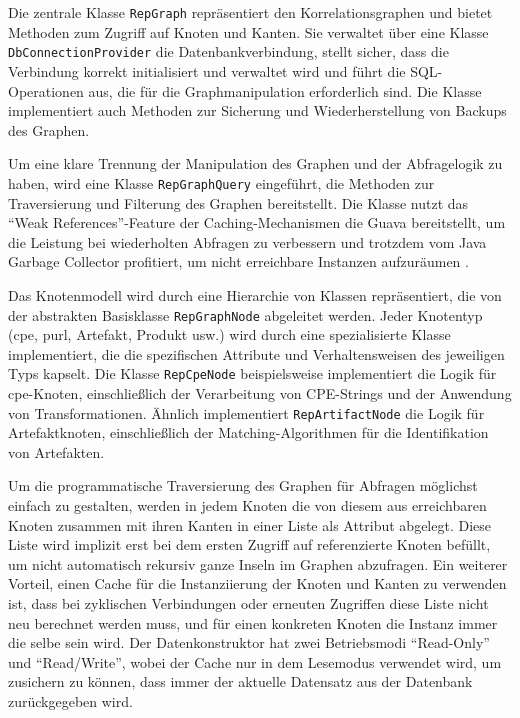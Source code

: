 Die zentrale Klasse \texttt{RepGraph} repräsentiert den Korrelationsgraphen und bietet Methoden zum Zugriff auf Knoten und Kanten.
Sie verwaltet über eine Klasse \texttt{DbConnectionProvider} die Datenbankverbindung, stellt sicher, dass die Verbindung korrekt initialisiert und verwaltet wird und führt die SQL-Operationen aus, die für die Graphmanipulation erforderlich sind.
Die Klasse implementiert auch Methoden zur Sicherung und Wiederherstellung von Backups des Graphen.

Um eine klare Trennung der Manipulation des Graphen und der Abfragelogik zu haben, wird eine Klasse \texttt{RepGraphQuery} eingeführt, die Methoden zur Traversierung und Filterung des Graphen bereitstellt.
Die Klasse nutzt das \enquote{Weak References}-Feature der Caching-Mechanismen die Guava bereitstellt, um die Leistung bei wiederholten Abfragen zu verbessern und trotzdem vom Java Garbage Collector profitiert, um nicht erreichbare Instanzen aufzuräumen \autocite{GuavaCachesExplained}.

Das Knotenmodell wird durch eine Hierarchie von Klassen repräsentiert, die von der abstrakten Basisklasse \texttt{RepGraphNode} abgeleitet werden.
Jeder Knotentyp (\acrshort{cpe}, \acrshort{purl}, Artefakt, Produkt usw.) wird durch eine spezialisierte Klasse implementiert, die die spezifischen Attribute und Verhaltensweisen des jeweiligen Typs kapselt.
Die Klasse \texttt{RepCpeNode} beispielsweise implementiert die Logik für \acrshort{cpe}-Knoten, einschließlich der Verarbeitung von CPE-Strings und der Anwendung von Transformationen.
Ähnlich implementiert \texttt{RepArtifactNode} die Logik für Artefaktknoten, einschließlich der Matching-Algorithmen für die Identifikation von Artefakten.

Um die programmatische Traversierung des Graphen für Abfragen möglichst einfach zu gestalten, werden in jedem Knoten die von diesem aus erreichbaren Knoten zusammen mit ihren Kanten in einer Liste als Attribut abgelegt.
Diese Liste wird implizit erst bei dem ersten Zugriff auf referenzierte Knoten befüllt, um nicht automatisch rekursiv ganze Inseln im Graphen abzufragen.
Ein weiterer Vorteil, einen Cache für die Instanziierung der Knoten und Kanten zu verwenden ist, dass bei zyklischen Verbindungen oder erneuten Zugriffen diese Liste nicht neu berechnet werden muss, und für einen konkreten Knoten die Instanz immer die selbe sein wird.
Der Datenkonstruktor hat zwei Betriebsmodi \enquote{Read-Only} und \enquote{Read/Write}, wobei der Cache nur in dem Lesemodus verwendet wird, um zusichern zu können, dass immer der aktuelle Datensatz aus der Datenbank zurückgegeben wird.

